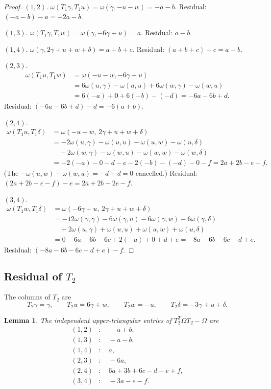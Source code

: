 \documentclass[11pt,a4paper]{article}
\newtheorem{lemma}{Lemma}
\theoremstyle{definition}
\theoremstyle{remark}
\begin{document}
\begin{proof}
$(1,2)$. $\omega(T_1\gamma,T_1u)=\omega(\gamma,-u-w)=-a-b$. Residual: $(-a-b)-a=-2a-b$.

$(1,3)$. $\omega(T_1\gamma,T_1w)=\omega(\gamma,-6\gamma+u)=a$. Residual: $a-b$.

$(1,4)$. $\omega(\gamma,2\gamma+u+w+\delta)=a+b+c$. Residual: $(a+b+c)-c=a+b$.

$(2,3)$.
\begin{align*}
\omega(T_1u,T_1w)
&=\omega(-u-w,-6\gamma+u)\\
&=6\omega(u,\gamma)-\omega(u,u)+6\omega(w,\gamma)-\omega(w,u)\\
&=6(-a)+0+6(-b)-(-d)=-6a-6b+d.
\end{align*}
Residual: $(-6a-6b+d)-d=-6(a+b)$.

$(2,4)$.
\begin{align*}
\omega(T_1u,T_1\delta)
&=\omega(-u-w,\ 2\gamma+u+w+\delta)\\
&=-2\omega(u,\gamma)-\omega(u,u)-\omega(u,w)-\omega(u,\delta)\\
&\quad-2\omega(w,\gamma)-\omega(w,u)-\omega(w,w)-\omega(w,\delta)\\
&=-2(-a)-0-d-e-2(-b)-(-d)-0-f=2a+2b-e-f.
\end{align*}
(The $-\omega(u,w)-\omega(w,u)=-d+d=0$ cancelled.) Residual: $(2a+2b-e-f)-e=2a+2b-2e-f$.

$(3,4)$.
\begin{align*}
\omega(T_1w,T_1\delta)
&=\omega(-6\gamma+u,\ 2\gamma+u+w+\delta)\\
&=-12\omega(\gamma,\gamma)-6\omega(\gamma,u)-6\omega(\gamma,w)-6\omega(\gamma,\delta)\\
&\quad+2\omega(u,\gamma)+\omega(u,u)+\omega(u,w)+\omega(u,\delta)\\
&=0-6a-6b-6c+2(-a)+0+d+e=-8a-6b-6c+d+e.
\end{align*}
Residual: $(-8a-6b-6c+d+e)-f$.
\end{proof}

\subsection{Residual of $T_2$}

The columns of $T_2$ are
\[
T_2\gamma=\gamma,\qquad T_2u=6\gamma+w,\qquad T_2w=-u,\qquad T_2\delta=-3\gamma+u+\delta.
\]

\begin{lemma}\label{lem:T2res}
The independent upper-triangular entries of $T_2^T\Omega T_2-\Omega$ are
\begin{align*}
(1,2)&:\quad -a+b,\\
(1,3)&:\quad -a-b,\\
(1,4)&:\quad a,\\
(2,3)&:\quad -6a,\\
(2,4)&:\quad 6a+3b+6c-d-e+f,\\
(3,4)&:\quad -3a-e-f.
\end{align*}
\end{lemma}
\end{document}
